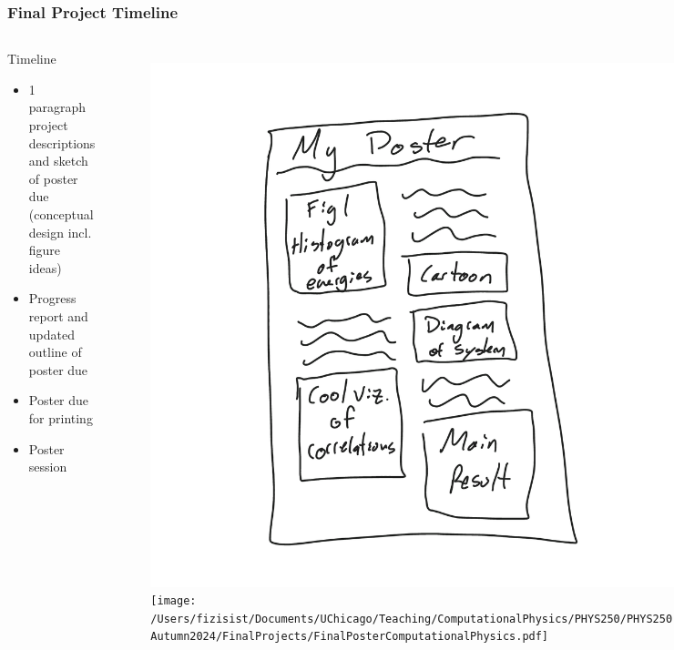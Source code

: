 \documentclass[hyperref={colorlinks=true}]{beamer}
\begin{document}

\begin{frame}%
  \frametitle{Final Project Timeline}

  \begin{columns}
  
    
    
  \begin{ucblock}{Timeline}
    \begin{itemize}
      \item {} 1 paragraph project descriptions and sketch of poster due (conceptual design incl. figure ideas)
      \item {} Progress report and updated outline of poster due
      \item {} Poster due for printing
      \item {} Poster session
    \end{itemize}
  \end{ucblock}
  
  
  \vspace{-1cm}
  
  \begin{figure}
    \includegraphics[width=0.9\columnwidth]{../Lecture3/PosterConcept.png}\\
    \texttt{[image: /Users/fizisist/Documents/UChicago/Teaching/ComputationalPhysics/PHYS250/PHYS250-Autumn2024/FinalProjects/FinalPosterComputationalPhysics.pdf]}\\
  \end{figure}

  
  \end{columns}

  
\end{frame}
\end{document}
